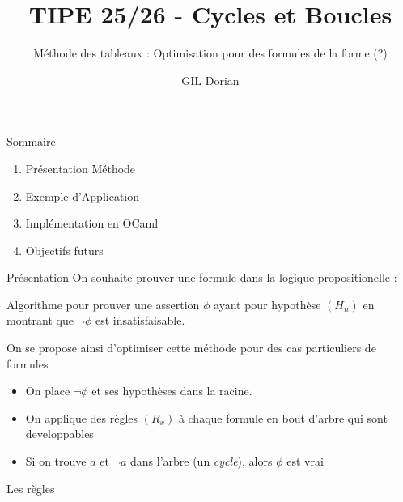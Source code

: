 \documentclass[]{beamer}
\title{TIPE 25/26 - Cycles et Boucles}
\author{GIL Dorian}
\subtitle{Méthode des tableaux : Optimisation pour des formules de la forme (?)}
\date{}
\begin{document}
\begin{frame}
\titlepage
\end{frame}

\begin{frame}{Sommaire}
\begin{enumerate}
    \item Présentation Méthode
    \item Exemple d'Application
    \item Implémentation en OCaml
    \item Objectifs futurs
\end{enumerate}
\end{frame}

\begin{frame}{Présentation}
    On souhaite prouver une formule dans la logique propositionelle :
    \begin{definition}
        Algorithme pour prouver une assertion $\phi$ ayant pour hypothèse $(H_n)$ en montrant
        que $\lnot \phi$ est insatisfaisable.
    \end{definition}
    On se propose ainsi d'optimiser cette méthode pour des cas particuliers de formules
    \pause
    \begin{itemize}
        \item On place $\lnot\phi$ et ses hypothèses dans la racine.
        \item On applique des règles $(R_x)$ à chaque formule en bout d'arbre qui sont developpables
        \item Si on trouve $a$ et $\lnot a$ dans l'arbre (un \textit{cycle}), alors $\phi$ est vrai
    \end{itemize}
    \pause
    Les règles
\end{frame}
\end{document}
